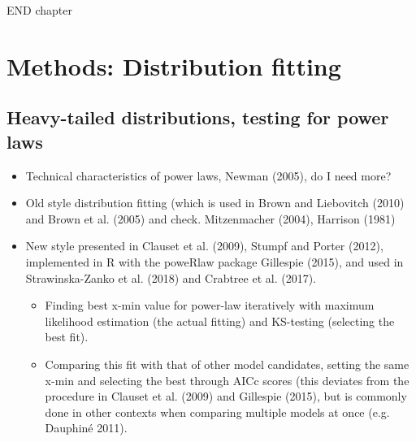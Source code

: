 \documentclass[
  12pt,
]{book}
\begin{document}
END chapter

\hypertarget{methods-distfit}{%
\chapter{Methods: Distribution fitting}\label{methods-distfit}}

\hypertarget{heavy-tailed-distributions-testing-for-power-laws}{%
\section{Heavy-tailed distributions, testing for power laws}\label{heavy-tailed-distributions-testing-for-power-laws}}

\begin{itemize}
\item
  Technical characteristics of power laws, Newman (2005), do I need more?
\item
  Old style distribution fitting (which is used in Brown and Liebovitch (2010) and Brown et al. (2005) and check. Mitzenmacher (2004), Harrison (1981)
\item
  New style presented in Clauset et al. (2009), Stumpf and Porter (2012), implemented in R with the poweRlaw package Gillespie (2015), and used in Strawinska-Zanko et al. (2018) and Crabtree et al. (2017).

  \begin{itemize}
  \item
    Finding best x-min value for power-law iteratively with maximum likelihood estimation (the actual fitting) and KS-testing (selecting the best fit).
  \item
    Comparing this fit with that of other model candidates, setting the same x-min and selecting the best through AICc scores (this deviates from the procedure in Clauset et al. (2009) and Gillespie (2015), but is commonly done in other contexts when comparing multiple models at once (e.g. Dauphiné 2011).
  \end{itemize}
\end{itemize}
\end{document}

